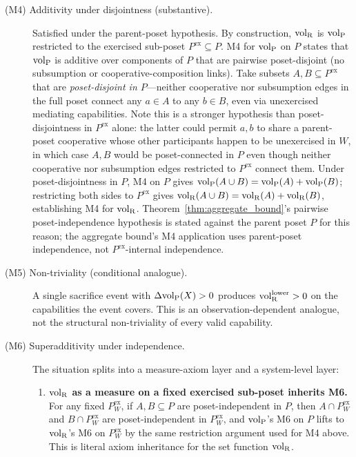 \begin{theorem}
\begin{description}
\item[(M4) Additivity under disjointness (substantive).]
  Satisfied under the parent-poset hypothesis.  By construction,
  ${\operatorname{vol}_{\mathrm{R}}}$ is ${\operatorname{vol}_{\mathrm{P}}}$ restricted to the exercised sub-poset
  $P^{\mathrm{ex}} \subseteq P$.  M4 for ${\operatorname{vol}_{\mathrm{P}}}$ on $P$ states
  that ${\operatorname{vol}_{\mathrm{P}}}$ is additive over components of $P$ that are
  pairwise poset-disjoint (no subsumption or
  cooperative-composition links).  Take subsets $A, B
  \subseteq P^{\mathrm{ex}}$ that are
  \emph{poset-disjoint in $P$}---neither cooperative nor
  subsumption edges in the full poset connect any $a \in A$ to
  any $b \in B$, even via unexercised mediating capabilities.
  Note this is a stronger hypothesis than poset-disjointness in
  $P^{\mathrm{ex}}$ alone: the latter could permit $a, b$ to
  share a parent-poset cooperative whose other participants
  happen to be unexercised in $W$, in which case $A, B$ would
  be poset-connected in $P$ even though neither cooperative
  nor subsumption edges restricted to $P^{\mathrm{ex}}$
  connect them.  Under poset-disjointness in $P$, M4 on $P$
  gives ${\operatorname{vol}_{\mathrm{P}}}(A \cup B) = {\operatorname{vol}_{\mathrm{P}}}(A) + {\operatorname{vol}_{\mathrm{P}}}(B)$; restricting
  both sides to $P^{\mathrm{ex}}$ gives ${\operatorname{vol}_{\mathrm{R}}}(A \cup B) =
  {\operatorname{vol}_{\mathrm{R}}}(A) + {\operatorname{vol}_{\mathrm{R}}}(B)$, establishing M4 for ${\operatorname{vol}_{\mathrm{R}}}$.
  Theorem~\ref{thm:aggregate_bound}'s pairwise
  poset-independence hypothesis is stated against the parent
  poset $P$ for this reason; the aggregate bound's M4
  application uses parent-poset independence, not
  $P^{\mathrm{ex}}$-internal independence.

\item[(M5) Non-triviality (conditional analogue).] A single
  sacrifice event with $\Delta{\operatorname{vol}_{\mathrm{P}}}(X) > 0$ produces
  ${\operatorname{vol}_{\mathrm{R}}^{\mathrm{lower}}} > 0$ on the capabilities the event covers.  This
  is an observation-dependent analogue, not the structural
  non-triviality of every valid capability.

\item[(M6) Superadditivity under independence.]
  The situation splits into a measure-axiom layer and a
  system-level layer:
  \begin{enumerate}
  \item[(a)] \textbf{${\operatorname{vol}_{\mathrm{R}}}$ as a measure on a fixed exercised
    sub-poset inherits M6.}
    For any fixed $P^{\mathrm{ex}}_W$, if $A, B \subseteq P$ are
    poset-independent in $P$, then $A \cap P^{\mathrm{ex}}_W$
    and $B \cap P^{\mathrm{ex}}_W$ are poset-independent in
    $P^{\mathrm{ex}}_W$, and ${\operatorname{vol}_{\mathrm{P}}}$'s M6 on $P$ lifts to
    ${\operatorname{vol}_{\mathrm{R}}}$'s M6 on $P^{\mathrm{ex}}_W$ by the same restriction
    argument used for M4 above.  This is literal axiom
    inheritance for the set function ${\operatorname{vol}_{\mathrm{R}}}$.


\end{enumerate}
\end{description}
\end{theorem}
